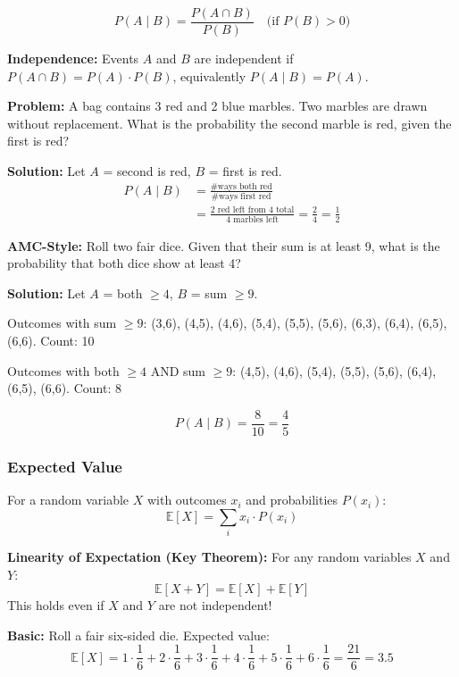 \documentclass[12pt]{extarticle}
\begin{document}
\[
P(A \mid B) = \frac{P(A \cap B)}{P(B)} \quad \text{(if } P(B) > 0\text{)}
\]

\textbf{Independence:} Events $A$ and $B$ are independent if $P(A \cap B) = P(A) \cdot P(B)$, equivalently $P(A \mid B) = P(A)$.

\begin{examplebox}
\textbf{Problem:} A bag contains 3 red and 2 blue marbles. Two marbles are drawn without replacement. What is the probability the second marble is red, given the first is red?

\textbf{Solution:} Let $A$ = second is red, $B$ = first is red.
\begin{align*}
P(A \mid B) &= \frac{\text{\# ways both red}}{\text{\# ways first red}} \\
&= \frac{\text{2 red left from 4 total}}{\text{4 marbles left}} = \frac{2}{4} = \frac{1}{2}
\end{align*}
\end{examplebox}

\begin{examplebox}
\textbf{AMC-Style:} Roll two fair dice. Given that their sum is at least 9, what is the probability that both dice show at least 4?

\textbf{Solution:} Let $A$ = both $\ge 4$, $B$ = sum $\ge 9$.

Outcomes with sum $\ge 9$: (3,6), (4,5), (4,6), (5,4), (5,5), (5,6), (6,3), (6,4), (6,5), (6,6). Count: 10

Outcomes with both $\ge 4$ AND sum $\ge 9$: (4,5), (4,6), (5,4), (5,5), (5,6), (6,4), (6,5), (6,6). Count: 8

\[
P(A \mid B) = \frac{8}{10} = \frac{4}{5}
\]
\end{examplebox}

\subsubsection{Expected Value}

For a random variable $X$ with outcomes $x_i$ and probabilities $P(x_i)$:
\[
\mathbb{E}[X] = \sum_i x_i \cdot P(x_i)
\]

\textbf{Linearity of Expectation (Key Theorem):} For any random variables $X$ and $Y$:
\[
\mathbb{E}[X+Y] = \mathbb{E}[X] + \mathbb{E}[Y]
\]
This holds even if $X$ and $Y$ are not independent!

\begin{examplebox}
\textbf{Basic:} Roll a fair six-sided die. Expected value:
\[
\mathbb{E}[X] = 1 \cdot \frac{1}{6} + 2 \cdot \frac{1}{6} + 3 \cdot \frac{1}{6} + 4 \cdot \frac{1}{6} + 5 \cdot \frac{1}{6} + 6 \cdot \frac{1}{6} = \frac{21}{6} = 3.5
\]
\end{examplebox}
\end{document}
